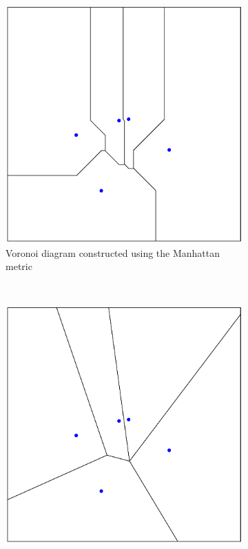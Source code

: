 \documentclass[preprint, 12pt]{elsarticle}
\begin{document}
\begin{figure}
	\caption{Example of Voronoi diagram with five seeds (firms). The solid lines are the boundaries of the Voronoi set (boundaries of market).}
	\centering
	\begin{subfigure}[b]{0.315\textwidth}
		\includegraphics[width=\textwidth]{Graphics/Voronoi_manhattan.pdf}
		\caption{Voronoi diagram constructed using the Manhattan metric}
		\label{fig:manhattan}
	\end{subfigure}
	~
	\begin{subfigure}[b]{0.315\textwidth}
		\includegraphics[width=\textwidth]{Graphics/Voronoi_euclidean.pdf}

\end{subfigure}
\end{figure}
\end{document}
